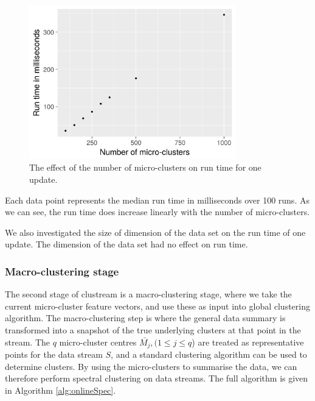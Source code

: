 \begin{figure}[h]
  \centering
  \includegraphics[width = 9cm]{efficiency_clustream.png}
  \caption{The effect of the number of micro-clusters on run time for one update.}
\label{fig:fuckYeahLinear}
\end{figure}

Each data point represents the median run time in milliseconds over 100 runs.  As we can see, the run time does increase linearly with the number of micro-clusters.

We also investigated the size of dimension of the data set on the run time of one update. The dimension of the data set had no effect on run time.  

\subsubsection{Macro-clustering stage}
 
The second stage of clustream is a macro-clustering stage, where we take the current micro-cluster feature vectors, and use these as input into global clustering algorithm. The macro-clustering step is where the general data summary is transformed into a snapshot of the true underlying clusters at that point in the stream. The $q$ micro-cluster centres $\bar{M_j},(1 \leq j \leq q$) are treated as representative points for the data stream $S$, and a standard clustering algorithm can be used to determine clusters. By using the micro-clusters to summarise the data, we can therefore perform spectral clustering on data streams.  The full algorithm is given in Algorithm \ref{alg:onlineSpec}. %


